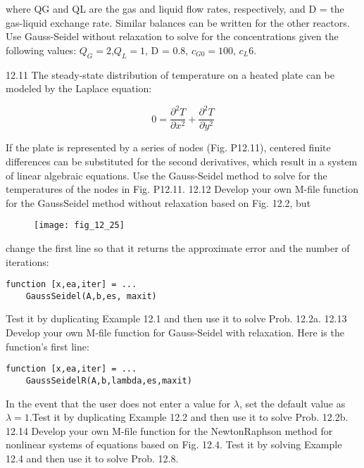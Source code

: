 \documentclass[../main.tex]{subfiles}
\begin{document}
where QG and QL are the gas and liquid flow rates, respectively, and D = the gas-liquid exchange rate. Similar balances
can be written for the other reactors. Use Gauss-Seidel without relaxation to solve for the concentrations given the following values: $Q_{G}=2$,$Q_{L}=1$, D = 0.8, $c_{G0}=100$, $c_{L}6$.

12.11 The steady-state distribution of temperature on a
heated plate can be modeled by the Laplace equation:

\begin{equation}
0=\frac{\partial^2 T}{\partial x^2}+\frac{\partial^2 T}{\partial y^2}
\end{equation}


If the plate is represented by a series of nodes (Fig. P12.11),
centered finite differences can be substituted for the second
derivatives, which result in a system of linear algebraic
equations. Use the Gauss-Seidel method to solve for the
temperatures of the nodes in Fig. P12.11.
12.12 Develop your own M-file function for the GaussSeidel method without relaxation based on Fig. 12.2, but

\begin{figure}[H]
		\centering
		\texttt{[image: fig\_12\_25]}
	   \label{fig:fig_12_25}
\end{figure}

change the first line so that it returns the approximate error
and the number of iterations:

\begin{lstlisting}[numbers=none]
function [x,ea,iter] = ...
	GaussSeidel(A,b,es, maxit)
\end{lstlisting}

Test it by duplicating Example 12.1 and then use it to solve
Prob. 12.2a.
12.13 Develop your own M-file function for Gauss-Seidel
with relaxation. Here is the function's first line:

\begin{lstlisting}[numbers=none]
function [x,ea,iter] = ...
	GaussSeidelR(A,b,lambda,es,maxit)
\end{lstlisting}

In the event that the user does not enter a value for $\lambda$, set the
default value as $\lambda=1$.Test it by duplicating Example 12.2
and then use it to solve Prob. 12.2b.
12.14 Develop your own M-file function for the NewtonRaphson method for nonlinear systems of equations based
on Fig. 12.4. Test it by solving Example 12.4 and then use it
to solve Prob. 12.8.
\end{document}
